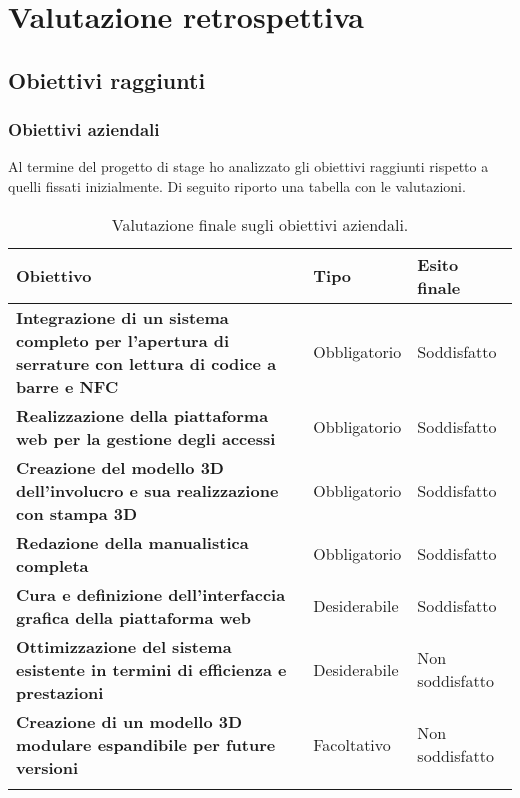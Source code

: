 
\chapter{Valutazione retrospettiva}
\label{cap:valutazione-retrospettiva}

\section{Obiettivi raggiunti}
\subsection{Obiettivi aziendali}
Al termine del progetto di stage ho analizzato gli obiettivi raggiunti rispetto a quelli fissati inizialmente. Di seguito riporto una tabella con le valutazioni.

\renewcommand{\arraystretch}{1.4}
\begin{longtable}{|p{7cm}|p{2.5cm}|p{3cm}|}
\hline
\textbf{Obiettivo} & \textbf{Tipo} & \textbf{Esito finale} \\ 
\hline
\textbf{Integrazione di un sistema completo per l'apertura di serrature con lettura di codice a barre e NFC} & Obbligatorio & Soddisfatto \\ 
\hline
\textbf{Realizzazione della piattaforma web per la gestione degli accessi} & Obbligatorio & Soddisfatto \\ 
\hline
\textbf{Creazione del modello 3D dell'involucro e sua realizzazione con stampa 3D} & Obbligatorio & Soddisfatto \\ 
\hline
\textbf{Redazione della manualistica completa} & Obbligatorio & Soddisfatto \\ 
\hline
\textbf{Cura e definizione dell'interfaccia grafica della piattaforma web} & Desiderabile & Soddisfatto \\ 
\hline
\textbf{Ottimizzazione del sistema esistente in termini di efficienza e prestazioni} & Desiderabile & Non soddisfatto \\ 
\hline
\textbf{Creazione di un modello 3D modulare espandibile per future versioni} & Facoltativo & Non soddisfatto \\ 
\hline
\caption{Valutazione finale sugli obiettivi aziendali.}
\end{longtable}

